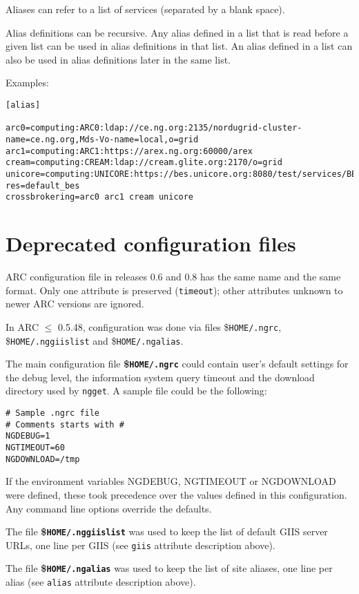  Aliases can refer to a list of services (separated by a blank space).

 Alias definitions can be recursive. Any alias
 defined in a list that is read before a given list can be used in
 alias definitions in that list. An alias defined in a list can also
 be used in alias definitions later in the same list.

 Examples:
\begin{verbatim}
[alias]

arc0=computing:ARC0:ldap://ce.ng.org:2135/nordugrid-cluster-name=ce.ng.org,Mds-Vo-name=local,o=grid
arc1=computing:ARC1:https://arex.ng.org:60000/arex
cream=computing:CREAM:ldap://cream.glite.org:2170/o=grid
unicore=computing:UNICORE:https://bes.unicore.org:8080/test/services/BESFactory?res=default_bes
crossbrokering=arc0 arc1 cream unicore
\end{verbatim}

\section{Deprecated configuration files}

ARC configuration file in releases 0.6 and 0.8 has the same name and the same
format. Only one attribute is preserved (\texttt{timeout}); other attributes
unknown to newer ARC versions are ignored.

In ARC $\leq$ 0.5.48, configuration was done via files {\$}\texttt{HOME/.ngrc},
{\$}\texttt{HOME/.nggiislist} and {\$}\texttt{HOME/.ngalias}.

The main configuration file \textbf{{\$}\texttt{HOME/.ngrc}} could contain
user's default settings for the debug level, the information system
query timeout and the download directory used by \texttt{ngget}. A
sample file could be the following:
\begin{verbatim}
# Sample .ngrc file
# Comments starts with #
NGDEBUG=1
NGTIMEOUT=60
NGDOWNLOAD=/tmp
\end{verbatim}

If the environment variables NGDEBUG, NGTIMEOUT or NGDOWNLOAD were
defined, these took precedence over the values defined in this
configuration. Any command line options override the defaults.

The file \textbf{{\$}\texttt{HOME/.nggiislist}} was used to keep the
list of default GIIS server URLs, one line per GIIS (see \texttt{giis}
attribute description above).

The file \textbf{{\$}\texttt{HOME/.ngalias}} was used to keep the
list of site aliases, one line per alias (see \texttt{alias}
attribute description above).
